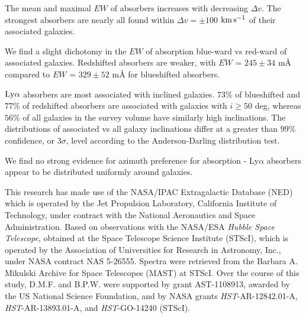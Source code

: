 \documentclass[twocolumn,tighten]{aastex6}
\begin{document}
\vspace{10pt}

\indent \textbullet \indent The mean and maximal $EW$ of absorbers increases with decreasing $\Delta v$. The strongest absorbers are nearly all found within $\Delta v = \pm 100$ $\rm km\, s^{-1}$ of their associated galaxies.

\vspace{10pt}

\indent \textbullet \indent We find a slight dichotomy in the $EW$ of absorption blue-ward vs red-ward of associated galaxies. Redshifted absorbers are weaker, with $\overline{EW}$ = $245 \pm 34$ $\textrm{m\AA}$ compared to $EW$ = $329 \pm 52$ $\textrm{m\AA}$ for blueshifted absorbers.

\vspace{10pt}

\textbullet \indent $\rm Ly\alpha$ absorbers are most associated with inclined galaxies. $73\%$ of blueshifted and $77\%$ of redshifted absorbers are associated with galaxies with $i \geq 50$ deg, whereas $56\%$ of all galaxies in the survey volume have similarly high inclinations. The distributions of associated vs all galaxy inclinations differ at a greater than $99\%$ confidence, or $3\sigma$, level according to the Anderson-Darling distribution test.

\vspace{10pt}

\indent \textbullet \indent We find no strong evidence for azimuth preference for absorption - Ly$\alpha$ absorbers appear to be distributed uniformly around galaxies.


\acknowledgements

This research has made use of the NASA/IPAC Extragalactic Database (NED) which is operated by the Jet Propulsion Laboratory, California Institute of Technology, under contract with the National Aeronautics and Space Administration. Based on observations with the NASA/ESA \textit{Hubble Space Telescope}, obtained at the Space Telescope Science Institute (STScI), which is operated by the Association of Universities for Research in Astronomy, Inc., under NASA contract NAS 5-26555. Spectra were retrieved from the Barbara A. Mikulski Archive for Space Telescopes (MAST) at STScI. Over the course of this study, D.M.F. and B.P.W. were supported by grant AST-1108913, awarded by the US National Science Foundation, and by NASA grants \textit{HST}-AR-12842.01-A, \textit{HST}-AR-13893.01-A, and \textit{HST}-GO-14240 (STScI).



\nocite{*}


\end{document}
